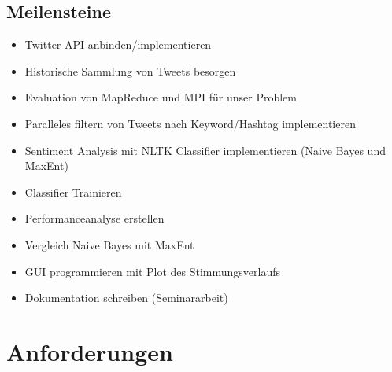 \documentclass[12pt, oneside]{report}   	%
\begin{document}
\section{Meilensteine}
\begin{itemize}
\item Twitter-API anbinden/implementieren
\item Historische Sammlung von Tweets besorgen
\item Evaluation von MapReduce und MPI für unser Problem
\item Paralleles filtern von Tweets nach Keyword/Hashtag implementieren
\item Sentiment Analysis mit NLTK Classifier implementieren (Naive Bayes und MaxEnt)
\item Classifier Trainieren
\item Performanceanalyse erstellen
\item Vergleich Naive Bayes mit MaxEnt
\item GUI programmieren mit Plot des Stimmungsverlaufs
\item Dokumentation schreiben (Seminararbeit)
\end{itemize}


\chapter{Anforderungen}
\end{document}

